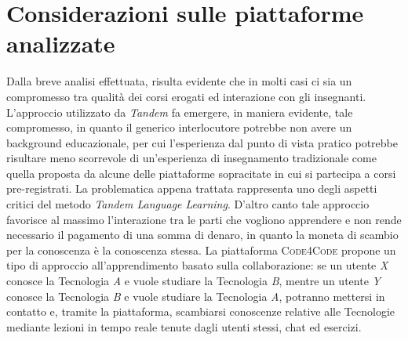\section{Considerazioni sulle piattaforme analizzate}
Dalla breve analisi effettuata, risulta evidente che in molti casi ci sia un compromesso tra qualità dei corsi erogati ed interazione con gli insegnanti. L'approccio utilizzato da \emph{Tandem} fa emergere, in maniera evidente, tale compromesso, in quanto il generico interlocutore potrebbe non avere un background educazionale, per cui l'esperienza dal punto di vista pratico potrebbe risultare meno scorrevole di un'esperienza di insegnamento tradizionale come quella proposta da alcune delle piattaforme sopracitate in cui si partecipa a corsi pre-registrati. La problematica appena trattata rappresenta uno degli aspetti critici del metodo \emph{Tandem Language Learning}. D'altro canto tale approccio favorisce al massimo l'interazione tra le parti che vogliono apprendere e non rende necessario il pagamento di una somma di denaro, in quanto la moneta di scambio per la conoscenza è la conoscenza stessa. La piattaforma \textsc{Code4Code} propone un tipo di approccio all'apprendimento basato sulla collaborazione: se un utente \emph{X} conosce la Tecnologia \emph{A} e vuole studiare la Tecnologia \emph{B}, mentre un utente \emph{Y} conosce la Tecnologia \emph{B} e vuole studiare la Tecnologia \emph{A}, potranno mettersi in contatto e, tramite la piattaforma, scambiarsi conoscenze relative alle Tecnologie mediante lezioni in tempo reale tenute dagli utenti stessi, chat ed esercizi. 